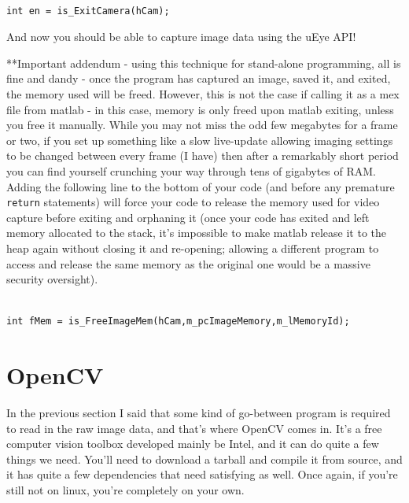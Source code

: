 \documentclass[12pt,a4paper]{article}
\begin{document}
\lstset{language=C++}
\begin{lstlisting}

int en = is_ExitCamera(hCam);

\end{lstlisting}

And now you should be able to capture image data using the uEye API!

**Important addendum - using this technique for stand-alone programming, all is fine and dandy - once the program has captured an image, saved it, and exited, the memory used will be freed. However, this is not the case if calling it as a mex file from matlab - in this case, memory is only freed upon matlab exiting, unless you free it manually. While you may not miss the odd few megabytes for a frame or two, if you set up something like a slow live-update allowing imaging settings to be changed between every frame (I have) then after a remarkably short period you can find yourself crunching your way through tens of gigabytes of RAM. Adding the following line to the bottom of your code (and before any premature \texttt{return} statements) will force your code to release the memory used for video capture before exiting and orphaning it (once your code has exited and left memory allocated to the stack, it's impossible to make matlab release it to the heap again without closing it and re-opening; allowing a different program to access and release the same memory as the original one would be a massive security oversight).

\lstset{language=C++}
\begin{lstlisting}

int fMem = is_FreeImageMem(hCam,m_pcImageMemory,m_lMemoryId);

\end{lstlisting}


\section{OpenCV}



In the previous section I said that some kind of go-between program is required to read in the raw image data, and that's where OpenCV comes in. It's a free computer vision toolbox developed mainly be Intel, and it can do quite a few things we need. You'll need to download a tarball and compile it from source, and it has quite a few dependencies that need satisfying as well. Once again, if you're still not on linux, you're completely on your own.
\end{document}

